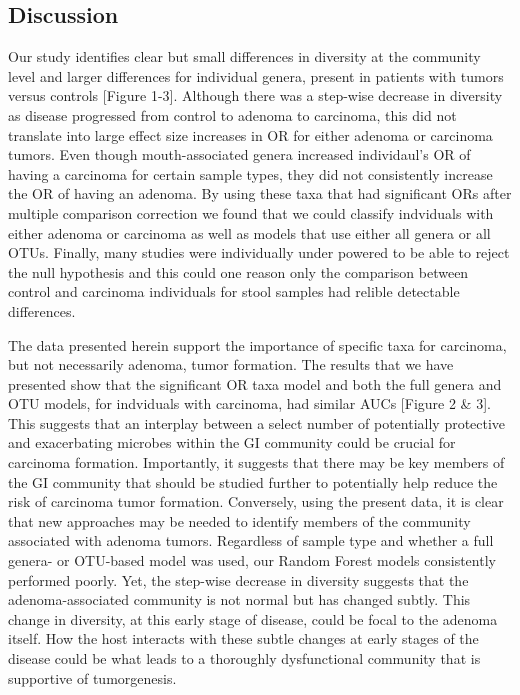 \documentclass[12pt,]{article}
\begin{document}
\newpage

\subsection{Discussion}\label{discussion}

Our study identifies clear but small differences in diversity at the
community level and larger differences for individual genera, present in
patients with tumors versus controls {[}Figure 1-3{]}. Although there
was a step-wise decrease in diversity as disease progressed from control
to adenoma to carcinoma, this did not translate into large effect size
increases in OR for either adenoma or carcinoma tumors. Even though
mouth-associated genera increased individaul's OR of having a carcinoma
for certain sample types, they did not consistently increase the OR of
having an adenoma. By using these taxa that had significant ORs after
multiple comparison correction we found that we could classify
indviduals with either adenoma or carcinoma as well as models that use
either all genera or all OTUs. Finally, many studies were individually
under powered to be able to reject the null hypothesis and this could
one reason only the comparison between control and carcinoma individuals
for stool samples had relible detectable differences.

The data presented herein support the importance of specific taxa for
carcinoma, but not necessarily adenoma, tumor formation. The results
that we have presented show that the significant OR taxa model and both
the full genera and OTU models, for indviduals with carcinoma, had
similar AUCs {[}Figure 2 \& 3{]}. This suggests that an interplay
between a select number of potentially protective and exacerbating
microbes within the GI community could be crucial for carcinoma
formation. Importantly, it suggests that there may be key members of the
GI community that should be studied further to potentially help reduce
the risk of carcinoma tumor formation. Conversely, using the present
data, it is clear that new approaches may be needed to identify members
of the community associated with adenoma tumors. Regardless of sample
type and whether a full genera- or OTU-based model was used, our Random
Forest models consistently performed poorly. Yet, the step-wise decrease
in diversity suggests that the adenoma-associated community is not
normal but has changed subtly. This change in diversity, at this early
stage of disease, could be focal to the adenoma itself. How the host
interacts with these subtle changes at early stages of the disease could
be what leads to a thoroughly dysfunctional community that is supportive
of tumorgenesis.
\end{document}
